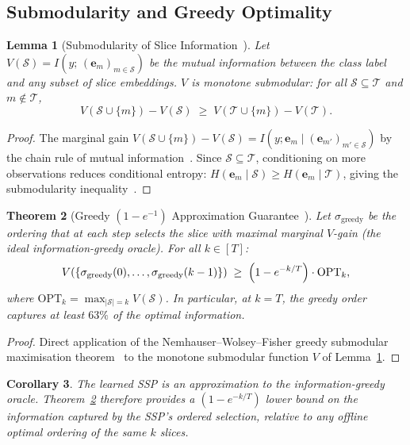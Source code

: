 \documentclass[11pt,a4paper]{article}
\newtheorem{lemma}{Lemma}[section]
\newtheorem{theorem}[lemma]{Theorem}
\newtheorem{corollary}[lemma]{Corollary}
\begin{document}
\subsection{Submodularity and Greedy Optimality}

\begin{lemma}[Submodularity of Slice Information~{\cite{krause2014,cover2006}}]
\label{lem:submod}
Let $V(\mathcal{S}) = I(y;\,(\mathbf{e}_m)_{m\in\mathcal{S}})$ be the mutual
information between the class label and any subset of slice embeddings.
$V$ is monotone submodular: for all $\mathcal{S}\subseteq\mathcal{T}$ and
$m\notin\mathcal{T}$,
\[
  V(\mathcal{S}\cup\{m\}) - V(\mathcal{S})
  \;\geq\;
  V(\mathcal{T}\cup\{m\}) - V(\mathcal{T}).
\]
\end{lemma}
\begin{proof}
The marginal gain $V(\mathcal{S}\cup\{m\})-V(\mathcal{S})=I(y;\mathbf{e}_m\mid
(\mathbf{e}_{m'})_{m'\in\mathcal{S}})$ by the chain rule of mutual information~\cite{cover2006}.
Since $\mathcal{S}\subseteq\mathcal{T}$, conditioning on more observations reduces
conditional entropy: $H(\mathbf{e}_m\mid\mathcal{S})\geq H(\mathbf{e}_m\mid\mathcal{T})$,
giving the submodularity inequality~\cite{krause2014}.
\end{proof}

\begin{theorem}[Greedy $(1-e^{-1})$ Approximation Guarantee~{\cite{nemhauser1978}}]
\label{thm:greedy}
Let $\sigma_\mathrm{greedy}$ be the ordering that at each step selects the slice
with maximal marginal $V$-gain (the ideal information-greedy oracle).  For all
$k\in[T]$:
\[
  V(\{\sigma_\mathrm{greedy}(0),\ldots,\sigma_\mathrm{greedy}(k-1)\})
  \;\geq\;
  \Bigl(1-e^{-k/T}\Bigr)\cdot\mathrm{OPT}_k,
\]
where $\mathrm{OPT}_k=\max_{|\mathcal{S}|=k}V(\mathcal{S})$.
In particular, at $k=T$, the greedy order captures at least $63\%$ of
the optimal information.
\end{theorem}
\begin{proof}
Direct application of the Nemhauser--Wolsey--Fisher greedy submodular
maximisation theorem~\cite{nemhauser1978} to the monotone submodular function
$V$ of Lemma~\ref{lem:submod}.
\end{proof}

\begin{corollary}
\label{cor:ssp_greedy}
The learned SSP is an approximation to the information-greedy oracle.
Theorem~\ref{thm:greedy} therefore provides a $(1-e^{-k/T})$ lower bound on
the information captured by the SSP's ordered selection, relative to any
offline optimal ordering of the same $k$ slices.
\end{corollary}
\end{document}
